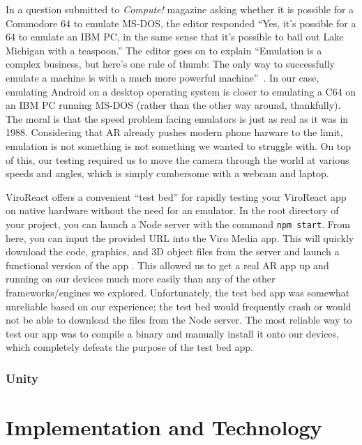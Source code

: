 \documentclass[a4paper, 10pt, american, titlepage]{article}
\begin{document}
In a question submitted to \textit{Compute!} magazine asking whether it is
possible for a Commodore 64 to emulate MS-DOS, the editor responded ``Yes, it's
possible for a 64 to emulate an IBM PC, in the same sense that it's possible to
bail out Lake Michigan with a teaspoon.'' The editor goes on to explain
``Emulation is a complex business, but here's one rule of thumb: The only way to
successfully emulate a machine is with a much more powerful
machine''~\autocite{warick1988}. In our case, emulating Android on a desktop
operating system is closer to emulating a C64 on an IBM PC running MS-DOS
(rather than the other way around, thankfully). The moral is that the speed
problem facing emulators is just as real as it was in 1988. Considering that AR
already pushes modern phone harware to the limit, emulation is not something is
not something we wanted to struggle with. On top of this, our testing required
us to move the camera through the world at various speeds and angles, which is
simply cumbersome with a webcam and laptop.

ViroReact offers a convenient ``test bed'' for rapidly testing your ViroReact
app on native hardware without the need for an emulator. In the root directory
of your project, you can launch a Node server with the command \texttt{npm
start}. From here, you can input the provided URL into the Viro Media app. This
will quickly download the code, graphics, and 3D object files from the server
and launch a functional version of the app \autocite{viro-testbed2019}. This
allowed us to get a real AR app up and running on our devices much more easily
than any of the other frameworks/engines we explored. Unfortunately, the test
bed app was somewhat unreliable based on our experience; the test bed would
frequently crash or would not be able to download the files from the Node
server. The most reliable way to test our app was to compile a binary and
manually install it onto our devices, which completely defeats the purpose of
the test bed app.

\subsubsection{Unity}
\label{sec:unity}

\newpage

\section{Implementation and Technology}
\label{sec:implementationAndTechnology}
\end{document}

